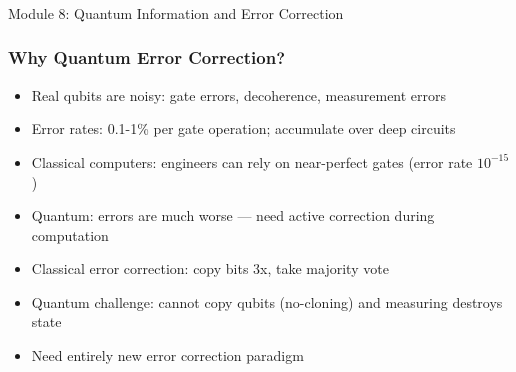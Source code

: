 
\begin{frame}[fragile]\frametitle{}
\begin{center}
{\Large Module 8: Quantum Information and Error Correction}
\end{center}
\end{frame}

\begin{frame}[fragile]\frametitle{Why Quantum Error Correction?}
\begin{itemize}
\item Real qubits are noisy: gate errors, decoherence, measurement errors
\item Error rates: 0.1-1\% per gate operation; accumulate over deep circuits
\item Classical computers: engineers can rely on near-perfect gates (error rate $10^{-15}$)
\item Quantum: errors are much worse --- need active correction during computation
\item Classical error correction: copy bits 3x, take majority vote
\item Quantum challenge: cannot copy qubits (no-cloning) and measuring destroys state
\item Need entirely new error correction paradigm
\end{itemize}
\end{frame}

